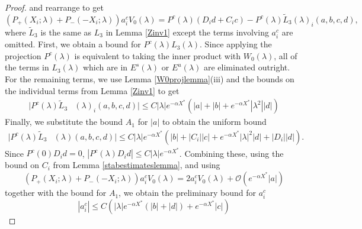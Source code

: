 \documentclass[thesis.tex]{subfiles}
\begin{document}
\begin{lemma}
\begin{proof}
 and rearrange to get  
\begin{equation}\label{PcDid}
(P_+(X_i; \lambda) + P_-(-X_i; \lambda))a_i^c V_0(\lambda) = 
P^c(\lambda)(D_i d + C_i c) - P^c(\lambda) \tilde{L}_3(\lambda)_i(a,b,c,d),
\end{equation}
where $\tilde{L}_3$ is the same as $L_3$ in Lemma \ref{Zinv1} except the terms involving $a_i^c$ are omitted. First, we obtain a bound for $P^c(\lambda)L_3(\lambda)$. Since applying the projection $P^c(\lambda)$ is equivalent to taking the inner product with $W_0(\lambda)$, all of the terms in $L_3(\lambda)$ which are in $E^s(\lambda)$ or $E^u(\lambda)$ are eliminated outright. For the remaining terms, we use Lemma \ref{W0projlemma}(iii) and the bounds on the individual terms from Lemma \ref{Zinv1} to get
\begin{align*}
|P^c(\lambda)\tilde{L}_3&(\lambda)_i(a,b,c,d)| \leq C |\lambda| e^{-\alpha X^*}  \left( |a| + |b| + e^{-\alpha X^*} |\lambda^2| |d| \right)
\end{align*}
Finally, we substitute the bound $A_1$ for $|a|$ to obtain the uniform bound  
\begin{align}\label{PcL3bound}
|P^c(\lambda)\tilde{L}_3&(\lambda)(a,b,c,d)| \leq C |\lambda| e^{-\alpha X^*}  \left( |b| + |C_i||c| + e^{-\alpha X^*} |\lambda|^2 |d| + |D_i||d| \right).
\end{align}
Since $P^c(0)D_i d = 0$, $|P^c(\lambda)D_i d| \leq C |\lambda|e^{-\alpha X^*}$. Combining these, using the bound on $C_i$ from Lemma \ref{stabestimateslemma}, and using
\[
(P_+(X_i; \lambda) + P_-(-X_i; \lambda))a_i^c V_0(\lambda) = 2 a_i^c V_0(\lambda) + \mathcal{O}(e^{-\alpha X^*}|a|)
\]
together with the bound for $A_1$, we obtain the preliminary bound for $a_i^c$
\begin{equation}\label{tildecbound1}
|a_i^c| \leq C \left( |\lambda| e^{-\alpha X^*}  \left( |b| + |d| \right) + e^{-\alpha X^*} |c| \right)
\end{equation}


\end{proof}
\end{lemma}
\end{document}
